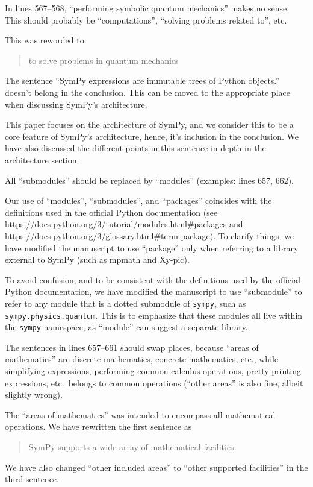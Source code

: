 \documentclass[answers,12pt]{exam}
\begin{document}
\begin{questions}
\question In lines 567--568, ``performing symbolic quantum mechanics'' makes no sense. This should probably be ``computations'', ``solving problems related to'', etc.
\begin{solution}
This was reworded to:
\begin{quote}
to solve problems in quantum mechanics
\end{quote}
\end{solution}

\question The sentence ``SymPy expressions are immutable trees of Python objects.'' doesn't belong in the conclusion. This can be moved to the appropriate place when discussing SymPy's architecture.
\begin{solution}
This paper focuses on the architecture of SymPy, and we consider this to be a
core feature of SymPy's architecture, hence, it's inclusion in the conclusion.
We have also discussed the different points in this sentence in depth in the architecture section.
\end{solution}

\question All ``submodules'' should be replaced by ``modules'' (examples:
lines 657, 662).
\label{rev3point37}
\begin{solution}
  Our use of ``modules'', ``submodules'', and ``packages'' coincides with the
  definitions used in the official Python documentation (see
  \url{https://docs.python.org/3/tutorial/modules.html#packages} and
  \url{https://docs.python.org/3/glossary.html#term-package}). To clarify
  things, we have modified the manuscript to use ``package'' only when
  referring to a library external to SymPy (such as mpmath and Xy-pic).

To avoid confusion, and to be consistent with the definitions used by the
official Python documentation, we have modified the manuscript to use
``submodule'' to refer to any module that is a dotted submodule of
\texttt{sympy}, such as \texttt{sympy.physics.quantum}. This is to emphasize
that these modules all live within the \texttt{sympy} namespace, as ``module''
can suggest a separate library.
\end{solution}

\question The sentences in lines 657--661 should swap places, because ``areas of mathematics'' are discrete mathematics, concrete mathematics, etc., while simplifying expressions, performing common calculus operations, pretty printing expressions, etc.\ belongs to common operations (``other areas'' is also fine, albeit slightly wrong).
\begin{solution}
The ``areas of mathematics'' was intended to encompass all mathematical
operations. We have rewritten the first sentence as
\begin{quote}
SymPy supports a wide array of mathematical facilities.
\end{quote}
We have also changed ``other included areas'' to ``other supported facilities'' in the third sentence.


\end{solution}
\end{questions}
\end{document}
